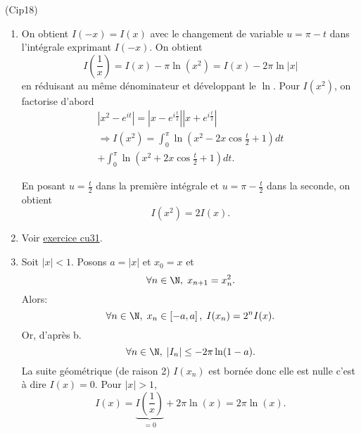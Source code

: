 \begin{tiny}(Cip18)\end{tiny} 
\begin{enumerate}
 \item On obtient $I(-x) = I(x)$ avec le changement de variable $u = \pi -t$ dans l'intégrale exprimant $I(-x)$.\newline
 On obtient 
 \[
 I(\frac{1}{x}) = I(x) -\pi\ln(x^2) = I(x) -2\pi \ln|x| 
 \]
en réduisant au même dénominateur et développant le $\ln$. Pour $I(x^2)$, on factorise d'abord
\begin{multline*}
 \left| x^2 - e^{it}\right| = \left| x - e^{i\frac{t}{2}}\right| \left| x + e^{i\frac{t}{2}}\right|\\
 \Rightarrow I(x^2)
 = \int_{0}^{\pi }\ln (x^{2} - 2x\cos\frac{t}{2} +1)dt \\ 
 + \int_{0}^{\pi }\ln (x^{2}+ 2x\cos\frac{t}{2} + 1)dt.
\end{multline*}

En posant $u=\frac{t}{2}$ dans la première intégrale et $u = \pi - \frac{t}{2}$ dans la seconde, on obtient
\[
 I(x^2) = 2I(x).
\]

 \item Voir \href{\baseurl temptex/fexcu.pdf}{exercice cu31}.

 \item
 Soit $|x|<1$. Posons $a = |x|$ et $x_0 = x$ et 
\[
 \forall n \in \N, \; x_{n+1} = x_n^2. 
\]
Alors:
\[
\forall n \in \N,\; x_n\in \left[ -a,a\right],\;
I(x_n) = 2^nI(x).
\]
Or, d'après b.
\[
\forall n \in \N,\; |I_n| \leq -2\pi \ln(1-a).
\]
La suite géométrique (de raison 2) $I(x_n)$ est bornée donc elle est nulle c'est à dire $I(x)=0$. Pour $|x|>1$,
\[
 I(x) = \underset{=0}{\underbrace{I(\frac{1}{x})}} + 2\pi\ln(x) = 2\pi\ln(x).
\]

\end{enumerate}

